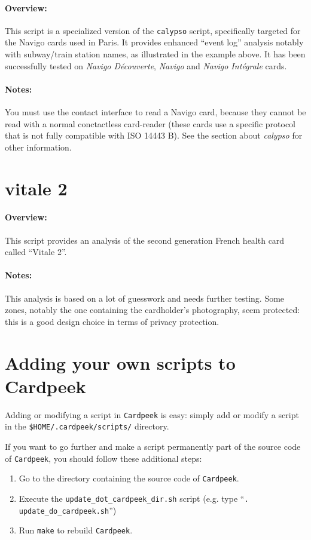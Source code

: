 \documentclass[11pt]{report}
\begin{document}
\paragraph{Overview:}
This script is a specialized version of the \texttt{calypso} script, specifically targeted for the Navigo cards used in Paris.
It provides enhanced ``event log'' analysis notably with subway/train station names, as illustrated in the example above.
It has been successfully tested on \emph{Navigo D\'ecouverte}, \emph{Navigo} and \emph{Navigo Int\'egrale} cards.

\paragraph{Notes:}
You must use the contact interface to read a Navigo card, because they cannot be read with a normal conctactless card-reader (these cards use a specific protocol that is not fully compatible with ISO 14443 B).
See the section about \emph{calypso} for other information.

\section{vitale 2}

\paragraph{Overview:}
This script provides an analysis of the second generation French health card called ``Vitale 2''.

\paragraph{Notes:}
This analysis is based on a lot of guesswork and needs further testing.
Some zones, notably the one containing the cardholder's photography, seem protected: this is a good design choice in terms of privacy protection.

\section{Adding your own scripts to Cardpeek}
Adding or modifying a script in \texttt{Cardpeek} is easy: simply add or modify a script in the \texttt{\$HOME/.cardpeek/scripts/} directory.

If you want to go further and make a script permanently part of the source code of \texttt{Cardpeek}, you should follow these additional steps:
\begin{enumerate}
\item{Go to the directory containing the source code of \texttt{Cardpeek}.}
\item{Execute the \texttt{update\_dot\_cardpeek\_dir.sh} script (e.g. type ``\texttt{. update\_do\_cardpeek.sh}'')}
\item{Run \texttt{make} to rebuild \texttt{Cardpeek}.}
\end{enumerate}
\end{document}
